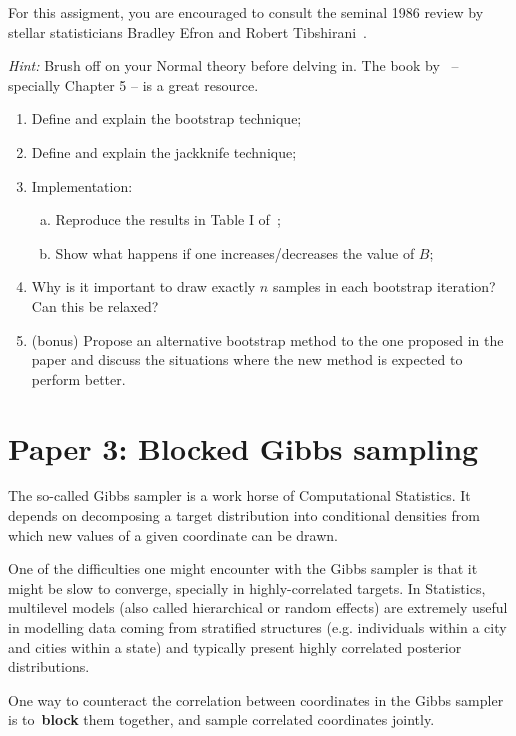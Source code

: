 \documentclass[a4paper,10pt, notitlepage]{report}
\begin{document}
For this assigment, you are encouraged to consult the seminal 1986 review by stellar statisticians Bradley Efron and Robert Tibshirani~\citep{Efron1986}.

\textit{Hint:} Brush off on your Normal theory before delving in.
The book by~\cite{Schervish2012} -- specially Chapter 5 -- is a great resource.

\begin{enumerate}
 \item Define and explain the bootstrap technique;
 \item Define and explain the jackknife technique;
 \item Implementation:
\begin{enumerate}[(a)]
   \item Reproduce the results in Table I of~\cite{Efron1986};
   \item Show what happens if one increases/decreases the value of $B$;
 \end{enumerate} 
 \item Why is it important to draw exactly $n$ samples in each bootstrap iteration? Can this be relaxed?
 \item (bonus) Propose an alternative bootstrap method to the one proposed in the paper and discuss the situations where the new method is expected to perform better.
\end{enumerate}

\section*{Paper 3: Blocked Gibbs sampling~\citep{Tan2009}}

The so-called Gibbs sampler is a work horse of Computational Statistics.
It depends on decomposing a target distribution into conditional densities from which new values of a given coordinate can be drawn.

One of the difficulties one might encounter with the Gibbs sampler is that it might be slow to converge, specially in highly-correlated targets.
In Statistics, multilevel models (also called hierarchical or random effects) are extremely useful in modelling data coming from stratified structures (e.g. individuals within a city and cities within a state) and typically present highly correlated posterior distributions.

One way to counteract the correlation between coordinates in the Gibbs sampler is to~\textbf{block} them together, and sample correlated coordinates jointly.
\end{document}
